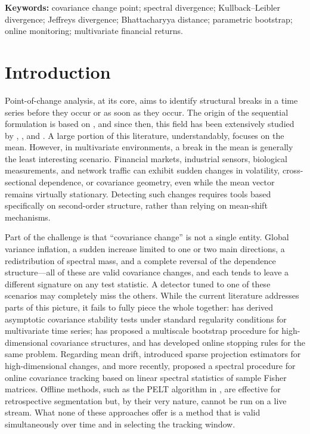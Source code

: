 \documentclass[11pt,a4paper]{article}
\begin{document}
\noindent\textbf{Keywords:} covariance change point; spectral divergence;
Kullback--Leibler divergence; Jeffreys divergence; Bhattacharyya distance;
parametric bootstrap; online monitoring; multivariate financial returns.

\section{Introduction}

Point-of-change analysis, at its core,
aims to identify structural breaks in a time series before they occur or as soon as they occur. The origin of the sequential formulation
is based on \citet{page1955}, and since then, this field has been
extensively studied by \citet{basseville1993}, \citet{aminikhanghahi2017}, and \citet{truong2020}. A
large portion of this literature, understandably, focuses on the mean. However, in multivariate
environments, a break in the mean is generally the least interesting scenario.
Financial markets, industrial sensors, biological measurements, and network traffic can exhibit sudden changes in volatility, cross-sectional dependence, or
covariance geometry, even while the mean vector remains virtually stationary. Detecting such
changes requires tools based specifically on second-order structure, rather than
relying on mean-shift mechanisms.



Part of the challenge is that “covariance change” is not a single entity.
Global variance inflation, a sudden increase limited to one or two main
directions, a redistribution of spectral mass, and
a complete reversal of the dependence structure—all of these are valid covariance changes, and each
tends to leave a different signature on any test statistic. A
detector tuned to one of these scenarios may completely miss the others.
While the current literature addresses parts of this picture, it
fails to fully piece the whole together: \citet{aue2009} has derived asymptotic covariance stability
tests under standard regularity conditions for multivariate time series;
\citet{avanesov2018} has proposed a multiscale bootstrap procedure for
high-dimensional covariance structures, and \citet{li2023} has developed
online stopping rules for the same problem. Regarding mean drift,
\citet{wang2018changepoint} introduced sparse
projection estimators for high-dimensional changes, and more recently, \citet{bao2026spectral}
proposed a spectral procedure for online covariance tracking
based on linear spectral statistics of sample Fisher matrices. Offline methods, such as the PELT algorithm in
\citet{killick2012}, are effective for retrospective
segmentation but, by their very nature, cannot be run on a live stream. What none of these approaches
offer is a method that is valid simultaneously
over time and in selecting the tracking window. 
\end{document}
